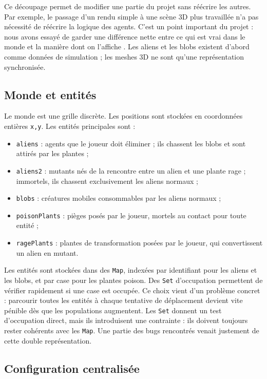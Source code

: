 ﻿\documentclass[11pt,a4paper]{article}
\begin{document}
Ce découpage permet de modifier une partie du projet sans réécrire les autres. Par exemple, le passage d'un rendu simple à une scène 3D plus travaillée n'a pas nécessité de réécrire la logique des agents. C'est un point important du projet : nous avons essayé de garder une différence nette entre \og ce qui est vrai dans le monde \fg{} et \og la manière dont on l'affiche \fg{}. Les aliens et les blobs existent d'abord comme données de simulation ; les meshes 3D ne sont qu'une représentation synchronisée.

\subsection{Monde et entités}

Le monde est une grille discrète. Les positions sont stockées en coordonnées entières \texttt{x,y}. Les entités principales sont :

\begin{itemize}[noitemsep]
  \item \texttt{aliens} : agents que le joueur doit éliminer ; ils chassent les blobs et sont attirés par les plantes ;
  \item \texttt{aliens2} : mutants nés de la rencontre entre un alien et une plante rage ; immortels, ils chassent exclusivement les aliens normaux ;
  \item \texttt{blobs} : créatures mobiles consommables par les aliens normaux ;
  \item \texttt{poisonPlants} : pièges posés par le joueur, mortels au contact pour toute entité ;
  \item \texttt{ragePlants} : plantes de transformation posées par le joueur, qui convertissent un alien en mutant.
\end{itemize}

Les entités sont stockées dans des \texttt{Map}, indexées par identifiant pour les aliens et les blobs, et par case pour les plantes poison. Des \texttt{Set} d'occupation permettent de vérifier rapidement si une case est occupée. Ce choix vient d'un problème concret : parcourir toutes les entités à chaque tentative de déplacement devient vite pénible dès que les populations augmentent. Les \texttt{Set} donnent un test d'occupation direct, mais ils introduisent une contrainte : ils doivent toujours rester cohérents avec les \texttt{Map}. Une partie des bugs rencontrés venait justement de cette double représentation.

\subsection{Configuration centralisée}
\end{document}
